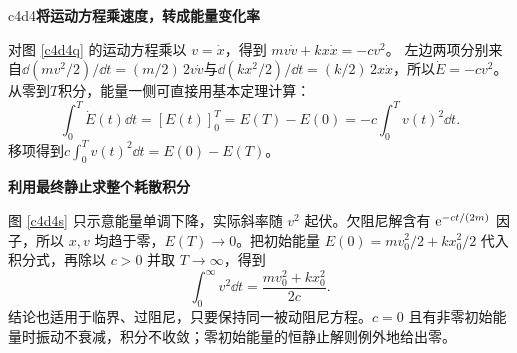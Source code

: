 \begin{drillsolution}{c4d4}\textbf{将运动方程乘速度，转成能量变化率}\par\nobreak
对图 \ref{c4d4q} 的运动方程乘以 $v=\dot x$，得到
$mv\dot v+kx\dot x=-cv^2$。
左边两项分别来自$\dd(mv^2/2)/\dd t=(m/2)\,2v\dot v$与$\dd(kx^2/2)/\dd t=(k/2)\,2x\dot x$，所以$\dot E=-cv^2$。从零到$T$积分，能量一侧可直接用基本定理计算：
\[
\int_0^T\dot E(t)\dd t=[E(t)]_0^T
=E(T)-E(0)=-c\int_0^T v(t)^2\dd t.
\]
移项得到$c\int_0^T v(t)^2\dd t=E(0)-E(T)$。


\par\medskip{}\noindent\textbf{利用最终静止求整个耗散积分}\par\nobreak
图 \ref{c4d4s} 只示意能量单调下降，实际斜率随 $v^2$ 起伏。欠阻尼解含有 $\mathrm e^{-ct/(2m)}$ 因子，所以 $x,v$ 均趋于零，$E(T)\to0$。把初始能量 $E(0)=mv_0^2/2+kx_0^2/2$ 代入积分式，再除以 $c>0$ 并取 $T\to\infty$，得到
\[
 \boxed{\int_0^\infty v^2\dd t
 =\frac{mv_0^2+kx_0^2}{2c}}.
\]
结论也适用于临界、过阻尼，只要保持同一被动阻尼方程。$c=0$ 且有非零初始能量时振动不衰减，积分不收敛；零初始能量的恒静止解则例外地给出零。
\end{drillsolution}
